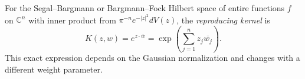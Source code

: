 
For the Segal--Bargmann or Bargmann--Fock Hilbert space of entire functions $f$ on $\mathbb C^n$ with inner product from $\pi^{-n}e^{-|z|^2}dV(z)$, the \emph{reproducing kernel} is
\[
K(z,w)=e^{z\cdot\overline w}=\exp\left(\sum_{j=1}^n z_j\overline{w_j}\right).
\]
This exact expression depends on the Gaussian normalization and changes with a different weight parameter.
